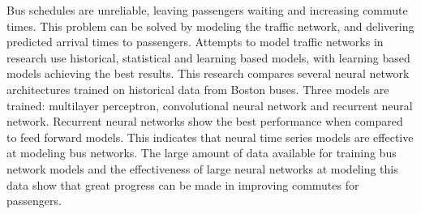 Bus schedules are unreliable, leaving passengers waiting and increasing commute times.
This problem can be solved by modeling the traffic network, and delivering predicted arrival times to passengers.
Attempts to model traffic networks in research use historical, statistical and learning based models, with learning based models achieving the best results.
This research compares several neural network architectures trained on historical data from Boston buses.
Three models are trained: multilayer perceptron, convolutional neural network and recurrent neural network.
Recurrent neural networks show the best performance when compared to feed forward models.
This indicates that neural time series models are effective at modeling bus networks.
The large amount of data available for training bus network models and the effectiveness of large neural networks at modeling this data show that great progress can be made in improving commutes for passengers.
